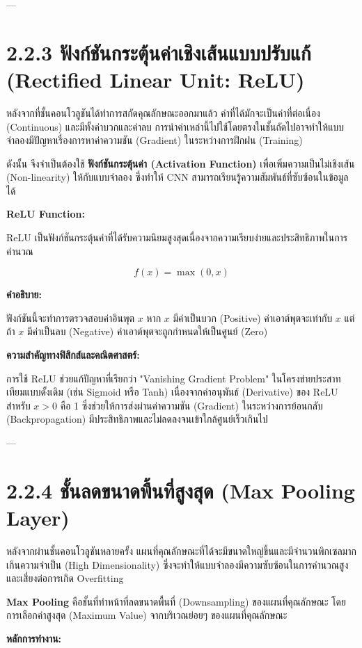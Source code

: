\documentclass[11pt,a4paper,openany]{report}
\begin{document}
---

\section{2.2.3 ฟังก์ชันกระตุ้นค่าเชิงเส้นแบบปรับแก้ (Rectified Linear Unit: ReLU)}


หลังจากที่ชั้นคอนโวลูชันได้ทำการสกัดคุณลักษณะออกมาแล้ว ค่าที่ได้มักจะเป็นค่าที่ต่อเนื่อง (Continuous) และมีทั้งค่าบวกและค่าลบ การนำค่าเหล่านี้ไปใช้โดยตรงในชั้นถัดไปอาจทำให้แบบจำลองมีปัญหาเรื่องการหาค่าความชัน (Gradient) ในระหว่างการฝึกฝน (Training)

ดังนั้น จึงจำเป็นต้องใช้ \textbf{ฟังก์ชันกระตุ้นค่า (Activation Function)} เพื่อเพิ่มความเป็นไม่เชิงเส้น (Non-linearity) ให้กับแบบจำลอง ซึ่งทำให้ CNN สามารถเรียนรู้ความสัมพันธ์ที่ซับซ้อนในข้อมูลได้

\textbf{ReLU Function:}

ReLU เป็นฟังก์ชันกระตุ้นค่าที่ได้รับความนิยมสูงสุดเนื่องจากความเรียบง่ายและประสิทธิภาพในการคำนวณ

$$f(x) = \max(0, x)$$


\textbf{คำอธิบาย:}

ฟังก์ชันนี้จะทำการตรวจสอบค่าอินพุต $x$ หาก $x$ มีค่าเป็นบวก (Positive) ค่าเอาต์พุตจะเท่ากับ $x$ แต่ถ้า $x$ มีค่าเป็นลบ (Negative) ค่าเอาต์พุตจะถูกกำหนดให้เป็นศูนย์ (Zero)

\textbf{ความสำคัญทางฟิสิกส์และคณิตศาสตร์:}

การใช้ ReLU ช่วยแก้ปัญหาที่เรียกว่า "Vanishing Gradient Problem" ในโครงข่ายประสาทเทียมแบบดั้งเดิม (เช่น Sigmoid หรือ Tanh) เนื่องจากค่าอนุพันธ์ (Derivative) ของ ReLU สำหรับ $x > 0$ คือ 1 ซึ่งช่วยให้การส่งผ่านค่าความชัน (Gradient) ในระหว่างการย้อนกลับ (Backpropagation) มีประสิทธิภาพและไม่ลดลงจนเข้าใกล้ศูนย์เร็วเกินไป

---

\section{2.2.4 ชั้นลดขนาดพื้นที่สูงสุด (Max Pooling Layer)}


หลังจากผ่านชั้นคอนโวลูชันหลายครั้ง แผนที่คุณลักษณะที่ได้จะมีขนาดใหญ่ขึ้นและมีจำนวนพิกเซลมากเกินความจำเป็น (High Dimensionality) ซึ่งจะทำให้แบบจำลองมีความซับซ้อนในการคำนวณสูงและเสี่ยงต่อการเกิด Overfitting

\textbf{Max Pooling} คือชั้นที่ทำหน้าที่ลดขนาดพื้นที่ (Downsampling) ของแผนที่คุณลักษณะ โดยการเลือกค่าสูงสุด (Maximum Value) จากบริเวณย่อยๆ ของแผนที่คุณลักษณะ

\textbf{หลักการทำงาน:}
\end{document}
